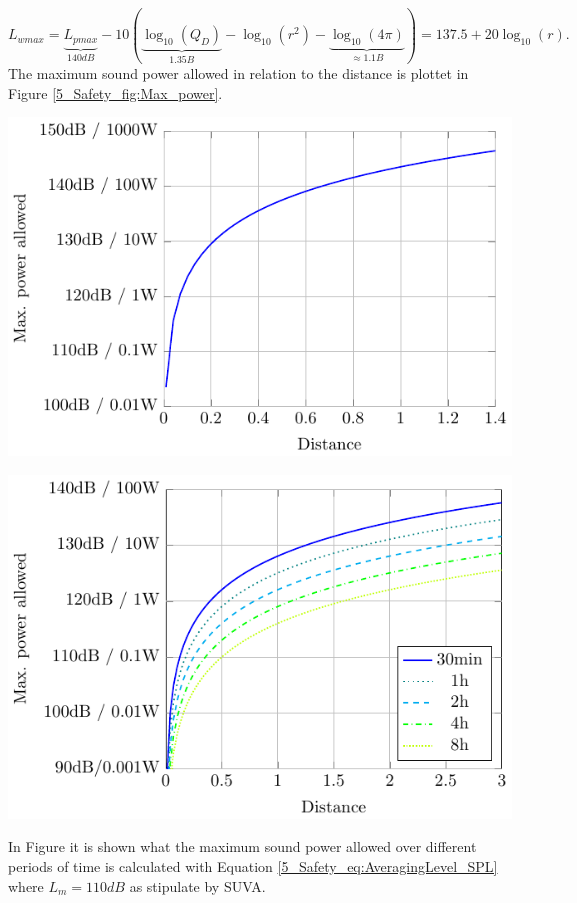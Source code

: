 \begin{equation}
         L_{wmax} 
     = 
     \underbrace{L_{pmax}}_{140dB} - 10\left ( \underbrace{\log_{10}(Q_D)}_{1.35B} - \log_{10}(r^2) - \underbrace{\log_{10}(4\pi)}_{\approx 1.1B}  \right ) = 137.5 + 20\log_{10}(r).
\end{equation}
The maximum sound power allowed in relation to the distance is plottet in Figure \ref{5_Safety_fig:Max_power}.
\begin{center}
    \begin{minipage}{0.49\textwidth}\label{5_Safety_fig:Max_power_allowed}
    \includegraphics[width=\textwidth]{images/5_Safety_Risks/Max_Power_Allowed.pdf}
    \end{minipage}
    \begin{minipage}{0.49\textwidth}
    \includegraphics[width=\textwidth]{images/5_Safety_Risks/Max_Power_Allowed_Time.pdf}
    \end{minipage}
\end{center}
In Figure \todo it is shown what the maximum sound power allowed over different periods of time is calculated with Equation \ref{5_Safety_eq:AveragingLevel_SPL} where $L_m = 110dB$ as stipulate by SUVA.    
